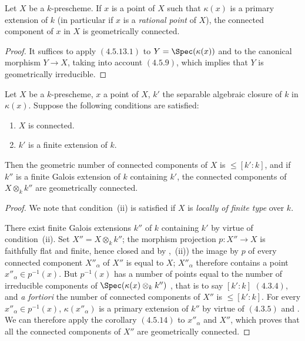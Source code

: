 \begin{corollary}[4.5.14]
\label{IV.4.5.14}
Let $X$ be a $k$-prescheme.
If $x$ is a point of $X$ such that $\kappa(x)$ is a primary extension of $k$ (in particular if $x$ is a \emph{rational point} of $X$), the connected component of $x$ in $X$ is geometrically connected.
\end{corollary}

\begin{proof}
It suffices to apply $(4.5.13.1)$ to $Y=\Spec(\kappa(x))$ and to the canonical morphism $Y\to X$, taking into account $(4.5.9)$, which implies that $Y$ is geometrically irreducible.
\end{proof}

\begin{proposition}[4.5.15]
\label{IV.4.5.15}
Let $X$ be a $k$-prescheme, $x$ a point of $X$, $k'$ the separable algebraic closure of $k$ in $\kappa(x)$.
Suppose the following conditions are satisfied:
\begin{enumerate}[label=(\roman*)]
  \item $X$ is connected.
  \item $k'$ is a finite extension of $k$.
\end{enumerate}
Then the geometric number of connected components of $X$ is $\leq [k':k]$, and if $k''$ is a finite Galois extension of $k$ containing $k'$, the connected components of $X\otimes_k k''$ are geometrically connected.
\end{proposition}

\begin{proof}
We note that condition~(ii) is satisfied if $X$ is \emph{locally of finite type} over $k$.

There exist finite Galois extensions $k''$ of $k$ containing $k'$ by virtue of condition~(ii).
Set $X''=X\otimes_k k''$; the morphism projection $p:X''\to X$ is faithfully flat and finite, hence closed  and by ,~(ii)) the image by $p$ of every connected component $X''_\alpha$ of $X''$ is equal to $X$; $X''_\alpha$ therefore contains a point $x''_\alpha\in p^{-1}(x)$.
But $p^{-1}(x)$ has a number of points equal to the number of irreducible components of $\Spec(\kappa(x)\otimes_k k'')$ , that is to say $[k':k]$ $(4.3.4)$, and \emph{a fortiori} the number of connected components of $X''$ is $\leq[k':k]$.
For every $x''_\alpha\in p^{-1}(x)$, $\kappa(x''_\alpha)$ is a primary extension of $k''$ by virtue of $(4.3.5)$ and .
We can therefore apply the corollary $(4.5.14)$ to $x''_\alpha$ and $X''$, which proves that all the connected components of $X''$ are geometrically connected.
\end{proof}

